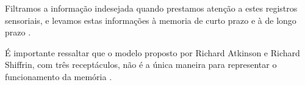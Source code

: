 Filtramos a informação indesejada quando prestamos atenção a estes registros sensoriais,
e levamos estas informações à memoria de curto prazo  e 
à de longo prazo
\cite[pp. 158-159]{sternbergpsicologia} \cite{pake2019psicologia}.
\begin{tcbattention}
É importante ressaltar que o modelo proposto por Richard Atkinson e Richard Shiffrin, 
com três receptáculos, 
não é a única maneira para representar o funcionamento da memória \cite[pp. 159]{sternbergpsicologia}.
\end{tcbattention}
